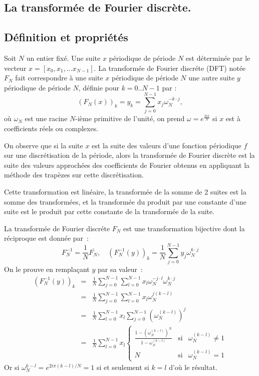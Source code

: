 \documentclass[a4paper,11pt]{article}
\begin{document}
\begin{giacjshere}
\section{La transform\'ee de Fourier discr\`ete.}
\label{sec:dft}
\subsection{D\'efinition et propri\'et\'es}
Soit $N$ un entier fixé. Une suite $x$ p\'eriodique de p\'eriode $N$ est
d\'etermin\'ee par le vecteur $x=[x_0,x_1,...x_{N-1}]$.
La transform\'ee de Fourier discr\'ete (DFT) notée $F_N$ fait correspondre 
à une suite $x$ p\'eriodique de p\'eriode $N$ une autre suite $y$
p\'eriodique de p\'eriode $N$, d\'efinie pour $k=0..N-1$ par :
\[ 
{(F_N(x))}_k=y_k=\sum_{j=0}^{N-1} x_j \omega_N^{-k\cdot j},
\]
où $\omega_N$ est une racine $N$-i\`eme primitive de l'unit\'e,
on prend $\omega=e^{\frac{2i\pi}{N}}$ si $x$ est à coefficients réels
ou complexes.

On observe que si la suite $x$ est la suite des valeurs d'une fonction
p\'eriodique $f$ sur une discr\'etisation de la p\'eriode, alors
la transform\'ee de Fourier discr\`ete est la suite des valeurs approch\'ees
des coefficients de Fourier obtenus en appliquant la m\'ethode des
trap\`ezes sur cette discr\'etisation.

Cette transformation est linéaire, la transformée de la somme de 2
suites est la somme des transformées, et la transformée du produit
par une constante d'une suite 
est le produit par cette constante de la transformée
de la suite.

La transform\'ee de Fourier discr\'ete  $F_N$ est une transformation 
bijective dont la réciproque est donnée par~:
\[ F_N^{-1}=\frac{1}{N} \overline{F_N}, \quad
{(F_N^{-1}(y))}_k=\frac{1}{N}\sum_{j=0}^{N-1}y_j\omega_N^{k\cdot j}
\]
On le prouve en remplaçant $y$ par sa valeur~:
\begin{eqnarray*}
{(F_N^{-1}(y))}_k &=&
\frac{1}{N}\sum_{j=0}^{N-1} \sum_{l=0}^{N-1} x_l \omega_N^{-j\cdot l}
\omega_N^{k\cdot j} \\
&=&
\frac{1}{N}\sum_{j=0}^{N-1} \sum_{l=0}^{N-1} x_l \omega_N^{j (k-l)} \\
&=& 
\frac{1}{N} \sum_{l=0}^{N-1} x_l \sum_{j=0}^{N-1} (\omega_N^{(k-l)})^j \\
&=&
\frac{1}{N} \sum_{l=0}^{N-1} x_l 
\left\{ \begin{array}{lcl}
\frac{1-(\omega_N^{(k-l)})^N}{1-\omega_N^{(k-l)}} & \mbox{si} &
\omega_N^{(k-l)}\neq 1 \\
N & \mbox{si} & \omega_N^{(k-l)} = 1 
\end{array} \right.
\end{eqnarray*}
Or si $\omega_N^{k-l}=e^{2i\pi(k-l)/N}=1$ si et seulement si $k=l$
d'où le résultat.


\end{giacjshere}
\end{document}
